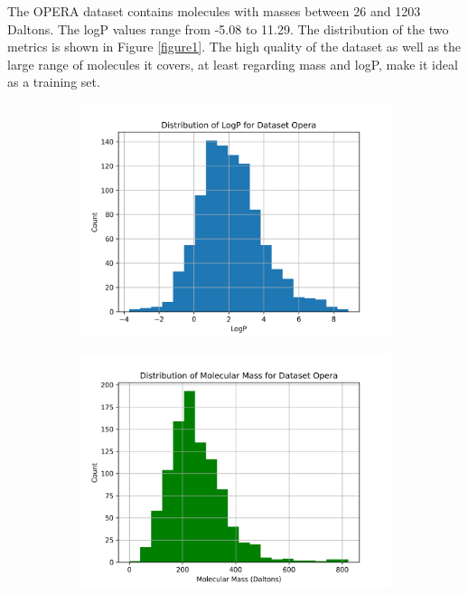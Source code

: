 \documentclass{article}
\begin{document}
The OPERA dataset contains molecules with masses between 26 and 1203 Daltons. The logP values range from -5.08 to 11.29. The distribution of the two metrics is shown in Figure \ref{figure1}. The high quality of the dataset as well as the large range of molecules it covers, at least regarding mass and logP, make it ideal as a training set.\\

\begin{figure}
\captionsetup[subfigure]{justification=Centering}

\begin{subfigure}[t]{0.45\textwidth}
    \includegraphics[width=\textwidth]{./../plots/logp_distribution_Opera.png}
\end{subfigure}\hspace{\fill} %
\begin{subfigure}[t]{0.45\textwidth}
    \includegraphics[width=\linewidth]{./../plots/molecular_mass_distribution_Opera.png}
\end{subfigure}


\end{figure}
\end{document}

